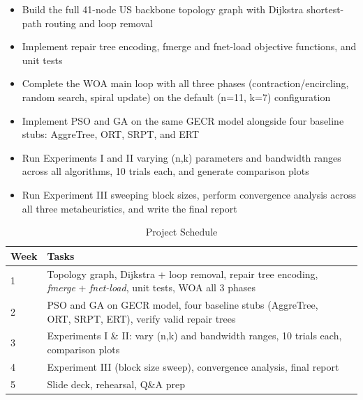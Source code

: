 \documentclass[sigconf]{acmart}
\begin{document}
\begin{itemize}
    \item Build the full 41-node US backbone topology graph with Dijkstra shortest-path routing and loop removal
    \item Implement repair tree encoding, fmerge and fnet-load objective functions, and unit tests
    \item Complete the WOA main loop with all three phases (contraction/encircling, random search, spiral update) on the default (n=11, k=7) configuration
    \item Implement PSO and GA on the same GECR model alongside four baseline stubs: AggreTree, ORT, SRPT, and ERT
    \item Run Experiments I and II varying (n,k) parameters and bandwidth ranges across all algorithms, 10 trials each, and generate comparison plots
    \item Run Experiment III sweeping block sizes, perform convergence analysis across all three metaheuristics, and write the final report
   
\end{itemize}


\begin{table}[h]
\caption{Project Schedule}
\centering
\begin{tabular}{l p{5.5cm} p{3cm}}
\toprule
\textbf{Week} & \textbf{Tasks}  \\
\midrule
1 & Topology graph, Dijkstra + loop removal, repair tree encoding, \textit{fmerge} + \textit{fnet-load}, unit tests, WOA all 3 phases \\[4pt]
2 & PSO and GA on GECR model, four baseline stubs (AggreTree, ORT, SRPT, ERT), verify valid repair trees\\[4pt]
3 & Experiments I \& II: vary (n,k) and bandwidth ranges, 10 trials each, comparison plots  \\[4pt]
4 & Experiment III (block size sweep), convergence analysis, final report \\[4pt]
5 & Slide deck, rehearsal, Q\&A prep \\
\bottomrule
\end{tabular}
\end{table}
\end{document}
